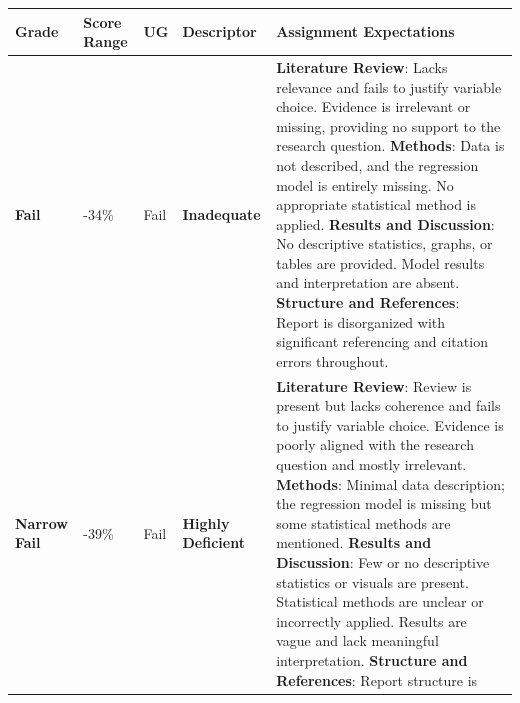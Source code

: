 \documentclass[
  letterpaper,
  DIV=11,
  numbers=noendperiod]{scrreprt}
\begin{document}
\begin{longtable}[]{@{}
  >{\raggedright\arraybackslash}p{}
  >{\raggedright\arraybackslash}p{}
  >{\raggedright\arraybackslash}p{}
  >{\raggedright\arraybackslash}p{}
  >{\raggedright\arraybackslash}p{}@{}}
\toprule\noalign{}
\begin{minipage}[b]{\linewidth}\raggedright
\textbf{Grade}
\end{minipage} & \begin{minipage}[b]{\linewidth}\raggedright
\textbf{Score Range}
\end{minipage} & \begin{minipage}[b]{\linewidth}\raggedright
\textbf{UG}
\end{minipage} & \begin{minipage}[b]{\linewidth}\raggedright
\textbf{Descriptor}
\end{minipage} & \begin{minipage}[b]{\linewidth}\raggedright
\textbf{Assignment Expectations}
\end{minipage} \\
\midrule\noalign{}
\endhead
\bottomrule\noalign{}
\endlastfoot
\textbf{Fail} & 0-34\% & Fail & \textbf{Inadequate} & \textbf{Literature
Review}: Lacks relevance and fails to justify variable choice. Evidence
is irrelevant or missing, providing no support to the research question.
\textbf{Methods}: Data is not described, and the regression model is
entirely missing. No appropriate statistical method is applied.
\textbf{Results and Discussion}: No descriptive statistics, graphs, or
tables are provided. Model results and interpretation are absent.
\textbf{Structure and References}: Report is disorganized with
significant referencing and citation errors throughout. \\
\textbf{Narrow Fail} & 35-39\% & Fail & \textbf{Highly Deficient} &
\textbf{Literature Review}: Review is present but lacks coherence and
fails to justify variable choice. Evidence is poorly aligned with the
research question and mostly irrelevant. \textbf{Methods}: Minimal data
description; the regression model is missing but some statistical
methods are mentioned. \textbf{Results and Discussion}: Few or no
descriptive statistics or visuals are present. Statistical methods are
unclear or incorrectly applied. Results are vague and lack meaningful
interpretation. \textbf{Structure and References}: Report structure is

\end{longtable}
\end{document}
